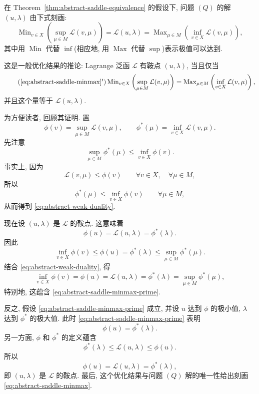 \setcounter{statement}{1}
\begin{Corollary}\label{cor:abstract-saddle-minmax}
在 Theorem~\ref{thm:abstract-saddle-equivalence} 的假设下,
问题 $(Q)$ 的解 $(u,\lambda)$ 由下式刻画:
\begin{equation}\label{eq:abstract-saddle-minmax}
\operatorname{Min}_{v\in X}\left(\sup_{\mu\in M}\mathcal L(v,\mu)\right)
=\mathcal L(u,\lambda)
=\operatorname{Max}_{\mu\in M}\left(\inf_{v\in X}\mathcal L(v,\mu)\right),
\end{equation}
其中用 $\operatorname{Min}$ 代替 $\inf$(相应地, 用 $\operatorname{Max}$ 代替 $\sup$)表示极值可以达到.
\end{Corollary}
\begin{Proof}
这是一般优化结果的推论: Lagrange 泛函 $\mathcal L$ 有鞍点
$(u,\lambda)$, 当且仅当
\begin{equation}\tag{\ref*{eq:abstract-saddle-minmax}$'$}
\label{eq:abstract-saddle-minmax-prime}
\operatorname{Min}_{v\in X}\left(\sup_{\mu\in M}\mathcal L(v,\mu)\right)
=\operatorname{Max}_{\mu\in M}\left(\inf_{v\in X}\mathcal L(v,\mu)\right),
\end{equation}
并且这个量等于 $\mathcal L(u,\lambda)$.

为方便读者, 回顾其证明. 置
\[
\phi(v)=\sup_{\mu\in M}\mathcal L(v,\mu),
\qquad
\phi^*(\mu)=\inf_{v\in X}\mathcal L(v,\mu).
\]
先注意
\begin{equation}\label{eq:abstract-weak-duality}
\sup_{\mu\in M}\phi^*(\mu)
\le\inf_{v\in X}\phi(v).
\end{equation}
事实上, 因为
\[
\mathcal L(v,\mu)\le\phi(v)
\qquad\forall v\in X,\quad\forall\mu\in M,
\]
所以
\[
\phi^*(\mu)\le\inf_{v\in X}\phi(v)
\qquad\forall\mu\in M,
\]
从而得到 
\eqref{eq:abstract-weak-duality}.

现在设 $(u,\lambda)$ 是 $\mathcal L$ 的鞍点. 这意味着
\[
\phi(u)=\mathcal L(u,\lambda)=\phi^*(\lambda).
\]
因此
\begin{equation}\label{eq:abstract-saddle-dual-chain}
\inf_{v\in X}\phi(v)
\le\phi(u)=\phi^*(\lambda)
\le\sup_{\mu\in M}\phi^*(\mu).
\end{equation}
结合 
\eqref{eq:abstract-weak-duality}, 得
\[
\inf_{v\in X}\phi(v)=\phi(u)=\mathcal L(u,\lambda)
=\phi^*(\lambda)=\sup_{\mu\in M}\phi^*(\mu),
\]
特别地, 这蕴含 
\eqref{eq:abstract-saddle-minmax-prime}.

反之, 假设 
\eqref{eq:abstract-saddle-minmax-prime} 成立, 并设 $u$ 达到 $\phi$ 的极小值,
$\lambda$ 达到 $\phi^*$ 的极大值. 此时
\eqref{eq:abstract-saddle-minmax-prime} 表明
\[
\phi(u)=\phi^*(\lambda).
\]
另一方面, $\phi$ 和 $\phi^*$ 的定义蕴含
\[
\phi^*(\lambda)\le\mathcal L(u,\lambda)\le\phi(u).
\]
所以
\[
\phi(u)=\mathcal L(u,\lambda)=\phi^*(\lambda),
\]
即 $(u,\lambda)$ 是 $\mathcal L$ 的鞍点.
最后, 这个优化结果与问题 $(Q)$ 解的唯一性给出刻画
\eqref{eq:abstract-saddle-minmax}.
\end{Proof}

